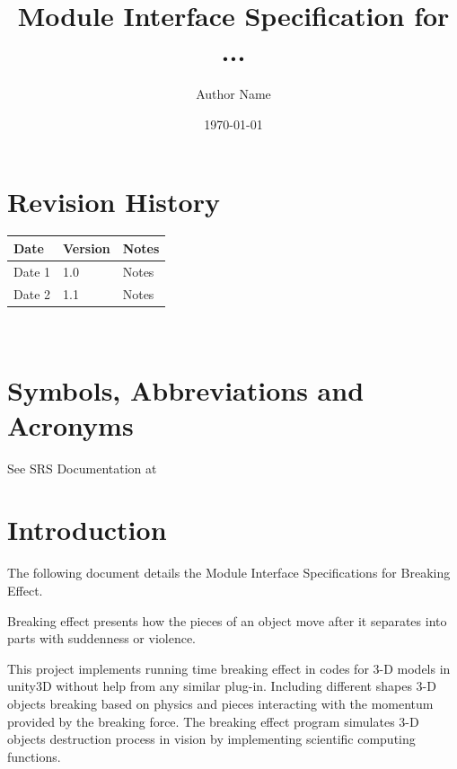 \documentclass[12pt, titlepage]{article}
\begin{document}
\title{Module Interface Specification for ...}

\author{Author Name}

\date{\today}

\maketitle


\section{Revision History}

\begin{tabularx}{\textwidth}{p{3cm}p{2cm}X}
\toprule {\bf Date} & {\bf Version} & {\bf Notes}\\
\midrule
Date 1 & 1.0 & Notes\\
Date 2 & 1.1 & Notes\\
\bottomrule
\end{tabularx}

~\newpage

\section{Symbols, Abbreviations and Acronyms}

See SRS Documentation at 


\newpage

\tableofcontents

\newpage


\section{Introduction}

The following document details the Module Interface Specifications for Breaking Effect.
 
Breaking effect presents how the pieces of an object move after it separates into parts with
suddenness or violence.

This project implements running time breaking effect in codes for 3-D models in unity3D without help from any similar plug-in. Including different shapes 3-D objects breaking based on physics and pieces interacting with the momentum provided by the breaking force. The breaking effect program simulates 3-D objects destruction process in vision by implementing scientific computing functions.
\end{document}
